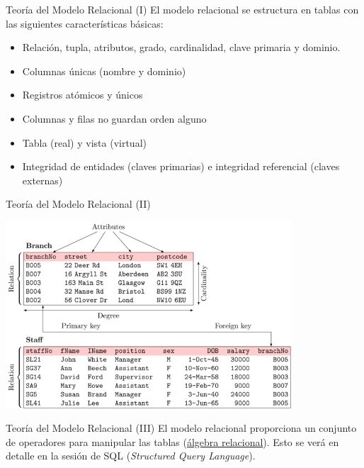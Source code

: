 \documentclass{classes/beamer_GeomaticaUA}
\begin{document}
\begin{frame}{Teoría del Modelo Relacional (I)}
El modelo relacional se estructura en tablas con las siguientes características básicas:
\begin{itemize}
\item Relación, tupla, atributos, grado, cardinalidad, clave primaria y dominio.
\item Columnas únicas (nombre y dominio)
\item Registros atómicos y únicos
\item Columnas y filas \alert{no guardan orden alguno}
\item Tabla (real) y vista (virtual)
\item Integridad de entidades (claves primarias) e integridad referencial (claves externas)
\end{itemize}
\end{frame}

\begin{frame}{Teoría del Modelo Relacional (II)}
\begin{center}
\includegraphics[width=0.8\textwidth]{images/relational_model.png} 
\end{center}
\end{frame}

\begin{frame}{Teoría del Modelo Relacional (III)}
El modelo relacional proporciona un conjunto de operadores para manipular las tablas (\href{http://es.wikipedia.org/wiki/\%C3\%81lgebra_relacional}{álgebra relacional}). Esto se verá en detalle en la sesión de SQL (\textit{Structured Query Language}).
\end{frame}
\end{document}
